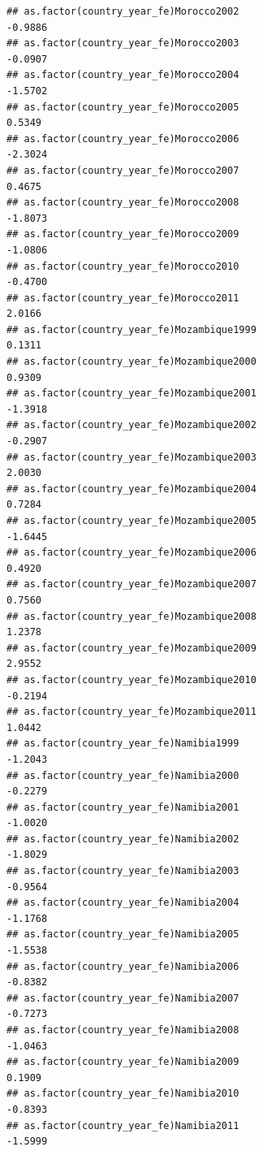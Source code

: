 \documentclass[
  a4paper,
]{article}
\begin{document}
\begin{verbatim}
## as.factor(country_year_fe)Morocco2002                          -0.9886
## as.factor(country_year_fe)Morocco2003                          -0.0907
## as.factor(country_year_fe)Morocco2004                          -1.5702
## as.factor(country_year_fe)Morocco2005                           0.5349
## as.factor(country_year_fe)Morocco2006                          -2.3024
## as.factor(country_year_fe)Morocco2007                           0.4675
## as.factor(country_year_fe)Morocco2008                          -1.8073
## as.factor(country_year_fe)Morocco2009                          -1.0806
## as.factor(country_year_fe)Morocco2010                          -0.4700
## as.factor(country_year_fe)Morocco2011                           2.0166
## as.factor(country_year_fe)Mozambique1999                        0.1311
## as.factor(country_year_fe)Mozambique2000                        0.9309
## as.factor(country_year_fe)Mozambique2001                       -1.3918
## as.factor(country_year_fe)Mozambique2002                       -0.2907
## as.factor(country_year_fe)Mozambique2003                        2.0030
## as.factor(country_year_fe)Mozambique2004                        0.7284
## as.factor(country_year_fe)Mozambique2005                       -1.6445
## as.factor(country_year_fe)Mozambique2006                        0.4920
## as.factor(country_year_fe)Mozambique2007                        0.7560
## as.factor(country_year_fe)Mozambique2008                        1.2378
## as.factor(country_year_fe)Mozambique2009                        2.9552
## as.factor(country_year_fe)Mozambique2010                       -0.2194
## as.factor(country_year_fe)Mozambique2011                        1.0442
## as.factor(country_year_fe)Namibia1999                          -1.2043
## as.factor(country_year_fe)Namibia2000                          -0.2279
## as.factor(country_year_fe)Namibia2001                          -1.0020
## as.factor(country_year_fe)Namibia2002                          -1.8029
## as.factor(country_year_fe)Namibia2003                          -0.9564
## as.factor(country_year_fe)Namibia2004                          -1.1768
## as.factor(country_year_fe)Namibia2005                          -1.5538
## as.factor(country_year_fe)Namibia2006                          -0.8382
## as.factor(country_year_fe)Namibia2007                          -0.7273
## as.factor(country_year_fe)Namibia2008                          -1.0463
## as.factor(country_year_fe)Namibia2009                           0.1909
## as.factor(country_year_fe)Namibia2010                          -0.8393
## as.factor(country_year_fe)Namibia2011                          -1.5999

\end{verbatim}
\end{document}
